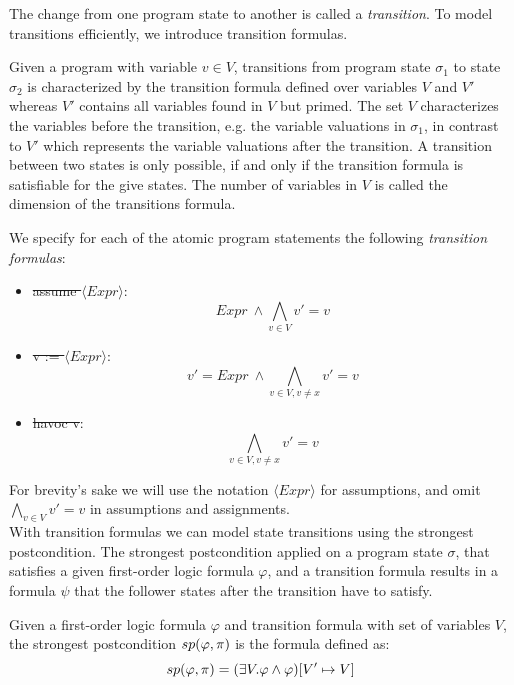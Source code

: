 The change from one program state to another is called a \textsl{transition}. To model transitions efficiently, we introduce transition formulas.
\begin{mydef}
		Given a program \prg with variable $v \in V$, transitions from program state $\sigma_1$ to state $\sigma_2$ is characterized by the transition formula defined over variables $V$ and $V'$ whereas $V'$ contains all variables found in $V$ but primed. The set $V$ characterizes the variables before the transition, e.g. the variable valuations in $\sigma_1$, in contrast to $V'$ which represents the variable valuations after the transition. A transition between two states is only possible, if and only if the transition formula is satisfiable for the give states. The number of variables in $V$ is called the dimension of the transitions formula.
\end{mydef}
 We specify for each of the atomic program statements the following \textsl{transition formulas}: 
 \begin{center}
\begin{itemize}
	\item \st{assume $\langle Expr \rangle$}: 
	\begin{equation*}
		Expr\ \land \bigwedge\limits_{v \in V} v' = v 
	\end{equation*}
	\item \st{v := $\langle Expr \rangle$}:
	\begin{equation*}
		v' = Expr\ \land \bigwedge\limits_{v \in V, v \not= x} v' = v 
	\end{equation*}
	\item \st{havoc v}: 
	\begin{equation*}
			\bigwedge\limits_{v \in V, v \not= x} v' = v 
	\end{equation*}
\end{itemize} 
 \end{center}
For brevity's sake we will use the notation \st{$\langle Expr \rangle$} for assumptions, and omit $\bigwedge\limits_{v \in V} v' = v$ in assumptions and assignments. \\
With transition formulas we can model state transitions using the strongest postcondition. The strongest postcondition applied on a program state $\sigma$, that satisfies a given first-order logic formula $\varphi$, and a transition formula \trf results in a formula $\psi$ that the follower states after the transition have to satisfy.
\begin{mydef}
	Given a first-order logic formula $\varphi$ and transition formula \trf with set of variables $V$, the strongest postcondition $	sp(\varphi, \pi)$ is the formula defined as:
	\begin{equation*}
		sp(\varphi, \pi) = (\exists V. \varphi \land \varphi)[V' \mapsto V]
	\end{equation*}
\end{mydef}
